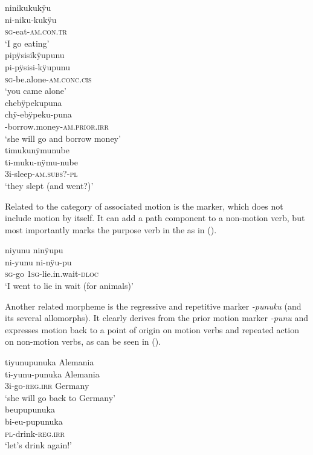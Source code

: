 \newpage
\ea\label{ex:Sketch-AM}
  \ea
\begingl
\glpreamble ninikukukÿu\\
\gla ni-niku-kukÿu\\
\textsc{sg}-eat-\textsc{am.con.tr}\\
\glft ‘I go eating’\\
\endgl
  \ex
\begingl
\glpreamble pipÿsisikÿupunu\\
\gla pi-pÿsisi-kÿupunu\\
\textsc{sg}-be.alone-\textsc{am.conc.cis}\\
\glft ‘you came alone’\\
\endgl
  \ex
\begingl
\glpreamble chebÿpekupuna\\
\gla chÿ-ebÿpeku-puna\\
-borrow.money-\textsc{am.prior.irr}\\
\glft ‘she will go and borrow money’\\
\endgl
  \ex
\begingl
\glpreamble timukunÿmunube\\
\gla ti-muku-nÿmu-nube\\
\glb 3i-sleep-\textsc{am.subs?}-\textsc{pl}\\
\glft ‘they slept (and went?)’\\
\endgl
\z
\xe

Related to the category of associated motion is the  marker, which does not include motion by itself. It can add a path component to a non-motion verb, but most importantly marks the purpose verb in the  as in ().

\ea\label{ex:Sketch-MCPC}
\begingl
\glpreamble niyunu ninÿupu\\
\gla ni-yunu ni-nÿu-pu\\
\textsc{sg}-go 1\textsc{sg}-lie.in.wait-\textsc{dloc}\\
\glft ‘I went to lie in wait (for animals)’\\
\endgl
\xe

Another related morpheme is the regressive and repetitive marker \textit{-punuku} (and its several allomorphs). It clearly derives from the prior motion marker \textit{-punu} and expresses motion back to a point of origin on motion verbs and repeated action on non-motion verbs, as can be seen in ().

\ea\label{ex:Sketch-regressive}
  \ea
\begingl
\glpreamble tiyunupunuka Alemania\\
\gla ti-yunu-punuka Alemania\\
\glb 3i-go-\textsc{reg.irr} Germany\\
\glft ‘she will go back to Germany’\\
\endgl
\newpage
  \ex
\begingl
\glpreamble beupupunuka\\
\gla bi-eu-pupunuka\\
\textsc{pl}-drink-\textsc{reg.irr}\\
\glft ‘let’s drink again!'\\
\endgl
\z
\xe

